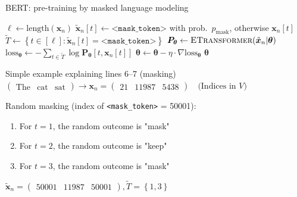 \documentclass[12pt,aspectratio=169,handout]{beamer}
\begin{document}
\begin{frame}{BERT: pre-training by masked language modeling}
	
	\vspace{-1em}	
	\begin{minipage}[t][10cm][t]{15cm}
		\begin{algorithmic}[1]
			\State $\ell \gets \text{length}(\bm{x}_n)$
			\State $\tilde{\bm{x}}_n[t] \gets \texttt{<mask\_token>}$ with prob.\ $p_{\text{mask}}$, otherwise $\bm{x}_n[t]$
			\EndFor
			\State $\tilde{T} \gets \left\{ t \in [\ell] : \tilde{\bm{x}}_n[t] = \texttt{<mask\_token>} \right\}$
			\State $\bm{P_{\theta}} \gets \textsc{ETransformer}(\tilde{\bm{x}}_n | \bm{\theta})$
			\State $\text{loss}_{\bm{\theta}} \gets - \sum_{t \in \tilde{T}} \log \bm{P_{\theta}} [t, \bm{x}_n[t]] $
			\State $\bm{\theta} \gets \bm{\theta} - \eta \cdot \nabla \text{loss}_{\bm{\theta}}$
			\EndFor
			\EndFor
			\State \Return $\bm{\theta}$
			\EndFunction
		\end{algorithmic}
		
	\end{minipage}
\end{frame}




\begin{frame}{Simple example explaining lines 6--7 (masking)}
	$
	\begin{pmatrix}
		\text{The} &
		\text{cat} &
		\text{sat}
	\end{pmatrix}
	\rightarrow
	\bm{x}_n =
	\begin{pmatrix}
		21 &
		11987 &
		5438
	\end{pmatrix}
	\quad \text{(Indices in $V$)}
	$
	
	Random masking (index of \texttt{<mask\_token>} = 50001):
	\begin{enumerate}
		\item For $t = 1$, the random outcome is "mask"
		\item For $t = 2$, the random outcome is "keep"
		\item For $t = 3$, the random outcome is "mask"
	\end{enumerate}
	$
	\bm{\tilde{x}}_n =
	\begin{pmatrix}
		50001 &
		11987 &
		50001
	\end{pmatrix},
	\tilde{T} = \left\{ 1, 3 \right\}
	$
	
	
	
\end{frame}
\end{document}
